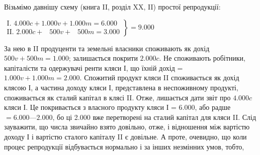Візьмімо давнішу схему (книга II, розділ XX, II) простої репродукції:

\begin{center}
$
 \left.\begin{aligned}
        \text{I. }4.000 c + 1.000 v + 1.000 m = 6.000\\
        \text{II. }2.000 c + \phantom{0.}500 v + \phantom{0.}500 m = 3.000
       \end{aligned}
 \right\}
  = 9.000
$
\end{center}
За нею в II продуценти та земельні власники споживають як дохід
$500 v + 500 m = 1.000$; залишається покрити $2.000 c$. Не споживають
робітники, капіталісти та одержувачі ренти кляси І, що їхній дохід =
$1.000 v + 1.000 m = 2.000$. Спожитий продукт кляси II споживається як дохід
клясою І, а частина доходу кляси І, представлена в неспоживному продукті,
споживається як сталий капітал в клясі II. Отже, лишається дати звіт про
$4.000 c$ кляси І. Це покривається з власного продукту кляси І = 6.000, або радше
$= 6.000 — 2.000$, бо ці 2.000 вже перетворені на сталий капітал для кляси II. Слід
зауважити, що числа звичайно взято довільно, отже, і відношення між вартістю
доходу І і вартістю сталого капіталу II є довільне. А проте, очевидно, що коли
процес репродукції відбувається нормально і за інших незмінних умов, тобто,
\parbreak{}  %
